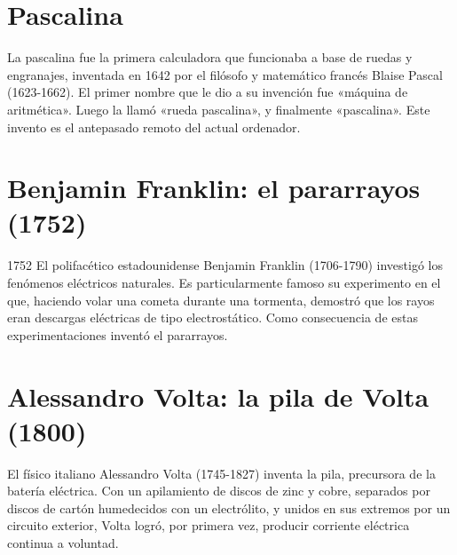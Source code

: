 \documentclass{article}
\begin{document}
\section{Pascalina}

La pascalina fue la primera calculadora que funcionaba a base de ruedas y engranajes, inventada en 1642 por el filósofo y matemático francés Blaise Pascal (1623-1662). El primer nombre que le dio a su invención fue «máquina de aritmética». Luego la llamó «rueda pascalina», y finalmente «pascalina». Este invento es el antepasado remoto del actual ordenador.\citep{Pascalina}

\section{Benjamin Franklin: el pararrayos (1752)}

1752 El polifacético estadounidense Benjamin Franklin (1706-1790) investigó los fenómenos eléctricos naturales. Es particularmente famoso su experimento en el que, haciendo volar una cometa durante una tormenta, demostró que los rayos eran descargas eléctricas de tipo electrostático. Como consecuencia de estas experimentaciones inventó el pararrayos.\citep{HDE}\\ 


\section{Alessandro Volta: la pila de Volta (1800)}

El físico italiano Alessandro Volta (1745-1827) inventa la pila, precursora de la batería eléctrica. Con un apilamiento de discos de zinc y cobre, separados por discos de cartón humedecidos con un electrólito, y unidos en sus extremos por un circuito exterior, Volta logró, por primera vez, producir corriente eléctrica continua a voluntad.\citep{HDE}\\

\end{document}
